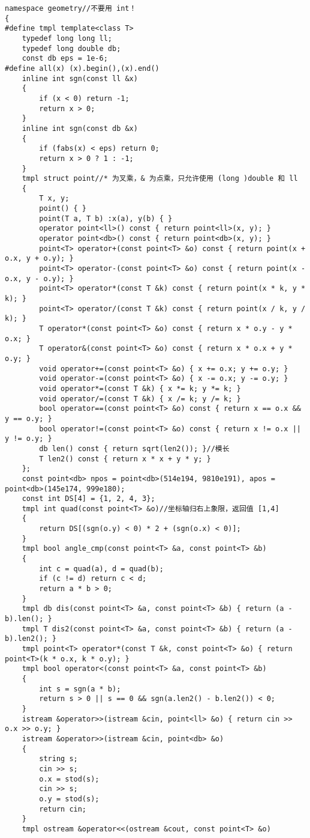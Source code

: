 \documentclass[12pt]{ctexart}
\begin{document}
\begin{lstlisting}
namespace geometry//不要用 int！
{
#define tmpl template<class T>
	typedef long long ll;
	typedef long double db;
	const db eps = 1e-6;
#define all(x) (x).begin(),(x).end()
	inline int sgn(const ll &x)
	{
		if (x < 0) return -1;
		return x > 0;
	}
	inline int sgn(const db &x)
	{
		if (fabs(x) < eps) return 0;
		return x > 0 ? 1 : -1;
	}
	tmpl struct point//* 为叉乘，& 为点乘，只允许使用 (long )double 和 ll
	{
		T x, y;
		point() { }
		point(T a, T b) :x(a), y(b) { }
		operator point<ll>() const { return point<ll>(x, y); }
		operator point<db>() const { return point<db>(x, y); }
		point<T> operator+(const point<T> &o) const { return point(x + o.x, y + o.y); }
		point<T> operator-(const point<T> &o) const { return point(x - o.x, y - o.y); }
		point<T> operator*(const T &k) const { return point(x * k, y * k); }
		point<T> operator/(const T &k) const { return point(x / k, y / k); }
		T operator*(const point<T> &o) const { return x * o.y - y * o.x; }
		T operator&(const point<T> &o) const { return x * o.x + y * o.y; }
		void operator+=(const point<T> &o) { x += o.x; y += o.y; }
		void operator-=(const point<T> &o) { x -= o.x; y -= o.y; }
		void operator*=(const T &k) { x *= k; y *= k; }
		void operator/=(const T &k) { x /= k; y /= k; }
		bool operator==(const point<T> &o) const { return x == o.x && y == o.y; }
		bool operator!=(const point<T> &o) const { return x != o.x || y != o.y; }
		db len() const { return sqrt(len2()); }//模长
		T len2() const { return x * x + y * y; }
	};
	const point<db> npos = point<db>(514e194, 9810e191), apos = point<db>(145e174, 999e180);
	const int DS[4] = {1, 2, 4, 3};
	tmpl int quad(const point<T> &o)//坐标轴归右上象限，返回值 [1,4]
	{
		return DS[(sgn(o.y) < 0) * 2 + (sgn(o.x) < 0)];
	}
	tmpl bool angle_cmp(const point<T> &a, const point<T> &b)
	{
		int c = quad(a), d = quad(b);
		if (c != d) return c < d;
		return a * b > 0;
	}
	tmpl db dis(const point<T> &a, const point<T> &b) { return (a - b).len(); }
	tmpl T dis2(const point<T> &a, const point<T> &b) { return (a - b).len2(); }
	tmpl point<T> operator*(const T &k, const point<T> &o) { return point<T>(k * o.x, k * o.y); }
	tmpl bool operator<(const point<T> &a, const point<T> &b)
	{
		int s = sgn(a * b);
		return s > 0 || s == 0 && sgn(a.len2() - b.len2()) < 0;
	}
	istream &operator>>(istream &cin, point<ll> &o) { return cin >> o.x >> o.y; }
	istream &operator>>(istream &cin, point<db> &o)
	{
		string s;
		cin >> s;
		o.x = stod(s);
		cin >> s;
		o.y = stod(s);
		return cin;
	}
	tmpl ostream &operator<<(ostream &cout, const point<T> &o)

\end{lstlisting}
\end{document}
